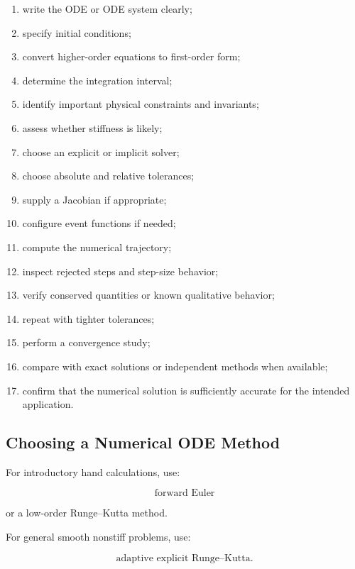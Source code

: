 \begin{enumerate}
    \item write the ODE or ODE system clearly;
    \item specify initial conditions;
    \item convert higher-order equations to first-order form;
    \item determine the integration interval;
    \item identify important physical constraints and invariants;
    \item assess whether stiffness is likely;
    \item choose an explicit or implicit solver;
    \item choose absolute and relative tolerances;
    \item supply a Jacobian if appropriate;
    \item configure event functions if needed;
    \item compute the numerical trajectory;
    \item inspect rejected steps and step-size behavior;
    \item verify conserved quantities or known qualitative behavior;
    \item repeat with tighter tolerances;
    \item perform a convergence study;
    \item compare with exact solutions or independent methods when
          available;
    \item confirm that the numerical solution is sufficiently accurate for
          the intended application.
\end{enumerate}

\subsection{Choosing a Numerical ODE Method}
\label{subsec:choosing-numerical-ode-method}

For introductory hand calculations, use:

\[
\boxed{
\text{forward Euler}
}
\]

or a low-order Runge--Kutta method.

For general smooth nonstiff problems, use:

\[
\boxed{
\text{adaptive explicit Runge--Kutta}.
}
\]

